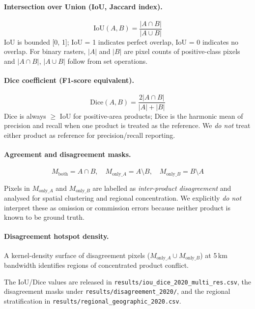 \documentclass[11pt]{article}
\begin{document}
\paragraph{Intersection over Union (IoU, Jaccard index).}
\begin{equation}
\text{IoU}(A, B) = \frac{|A \cap B|}{|A \cup B|}
\label{eq:iou}
\end{equation}
IoU is bounded [0, 1]; IoU = 1 indicates perfect overlap, IoU = 0 indicates no
overlap. For binary rasters, $|A|$ and $|B|$ are pixel counts of positive-class
pixels and $|A \cap B|$, $|A \cup B|$ follow from set operations.

\paragraph{Dice coefficient (F1-score equivalent).}
\begin{equation}
\text{Dice}(A, B) = \frac{2|A \cap B|}{|A| + |B|}
\label{eq:dice}
\end{equation}
Dice is always $\geq$ IoU for positive-area products; Dice is the harmonic mean
of precision and recall when one product is treated as the reference. We \emph{do
not} treat either product as reference for precision/recall reporting.

\paragraph{Agreement and disagreement masks.}
\begin{equation}
M_{\text{both}} = A \cap B, \quad
M_{\text{only}\_A} = A \setminus B, \quad
M_{\text{only}\_B} = B \setminus A
\label{eq:masks}
\end{equation}

Pixels in $M_{\text{only}\_A}$ and $M_{\text{only}\_B}$ are labelled as
\emph{inter-product disagreement} and analysed for spatial clustering and
regional concentration. We explicitly \emph{do not} interpret these as omission
or commission errors because neither product is known to be ground truth.

\paragraph{Disagreement hotspot density.}
A kernel-density surface of disagreement pixels ($M_{\text{only}\_A} \cup
M_{\text{only}\_B}$) at 5\,km bandwidth identifies regions of concentrated
product conflict.

The IoU/Dice values are released in
\texttt{results/iou\_dice\_2020\_multi\_res.csv}, the disagreement masks under
\texttt{results/disagreement\_2020/}, and the regional stratification in
\texttt{results/regional\_geographic\_2020.csv}.
\end{document}
